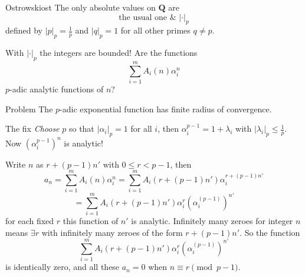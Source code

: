 \documentclass[notheorems]{beamer}
\theoremstyle{plain}
\newcommand{\QQ}{\mathbf Q}
\newcommand{\lt}{<}
\begin{document}
\begin{frame}
    \begin{theorem}{Ostrowski}{ost}\label{theorem-36}
The only absolute values on \(\QQ\) are%
\begin{equation*}
	\text{the usual one}\,\, \&\,\, |\cdot|_p
\end{equation*}
defined by \(|p|_p = \frac1p\) and \(|q|_p = 1\) for all other primes \(q \ne p\).%
\end{theorem}
\pause
With \(|\cdot|_p\) the integers are bounded!
\pause
Are the functions%
\begin{equation*}
\sum_{i=1}^m A_i(n)\alpha_i^n
\end{equation*}
\(p\)-adic analytic functions of \(n\)?%
\par
\pause
\begin{alertblock}{Problem}
The \(p\)-adic exponential function has finite radius of convergence.
\end{alertblock}
\pause
\begin{exampleblock}{The fix}
\emph{Choose} \(p\) so that \(|\alpha_i|_p = 1\) for all \(i\), then \(\alpha_i^{p-1} = 1 + \lambda_i\) with \(|\lambda_i|_p \le \frac 1p\).
Now \((\alpha_i^{p-1})^n\) is analytic!%
\end{exampleblock}
\end{frame}

\begin{frame}
Write \(n\) as \(r + (p-1)n'\) with \(0\le r \lt p-1\)\pause, then
\begin{equation*}
a_n = \sum_{i=1}^m A_i(n)\alpha_i^n = \sum_{i=1}^m A_i(r + (p-1)n')\alpha_i^{r + (p-1)n'}
\end{equation*}
%
\begin{equation*}
= \sum_{i=1}^m A_i(r + (p-1)n')\alpha_i^{r} (\alpha_i^{(p-1)})^{n'}
\end{equation*}
for each fixed \(r\) this function of \(n'\) is analytic.
\pause Infinitely many zeroes for integer \(n\) means \(\exists r\) with infinitely many zeroes of the form \(r + (p-1)n'\). So the function%
\begin{equation*}
\sum_{i=1}^m A_i(r + (p-1)n')\alpha_i^{r} (\alpha_i^{(p-1)})^{n'}
\end{equation*}
is identically zero, and all these \(a_n = 0\) when \(n \equiv r \pmod{p-1}\).%
\par
\end{frame}
\end{document}

